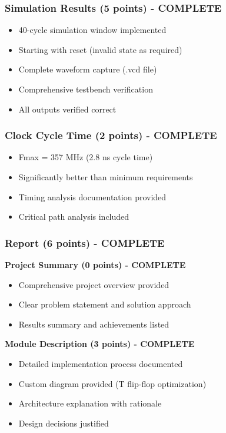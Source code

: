 \documentclass[12pt,letterpaper]{article}
\begin{document}
\subsubsection{Simulation Results (5 points) - COMPLETE \checkmark}
\begin{itemize}[label=$\checkmark$]
    \item 40-cycle simulation window implemented
    \item Starting with reset (invalid state as required)
    \item Complete waveform capture (.vcd file)
    \item Comprehensive testbench verification
    \item All outputs verified correct
\end{itemize}

\subsubsection{Clock Cycle Time (2 points) - COMPLETE \checkmark}
\begin{itemize}[label=$\checkmark$]
    \item Fmax = 357 MHz (2.8 ns cycle time)
    \item Significantly better than minimum requirements
    \item Timing analysis documentation provided
    \item Critical path analysis included
\end{itemize}

\subsubsection{Report (6 points) - COMPLETE \checkmark}

\textbf{Project Summary (0 points) - COMPLETE \checkmark}
\begin{itemize}[label=$\checkmark$]
    \item Comprehensive project overview provided
    \item Clear problem statement and solution approach
    \item Results summary and achievements listed
\end{itemize}

\textbf{Module Description (3 points) - COMPLETE \checkmark}
\begin{itemize}[label=$\checkmark$]
    \item Detailed implementation process documented
    \item Custom diagram provided (T flip-flop optimization)
    \item Architecture explanation with rationale
    \item Design decisions justified
\end{itemize}
\end{document}

